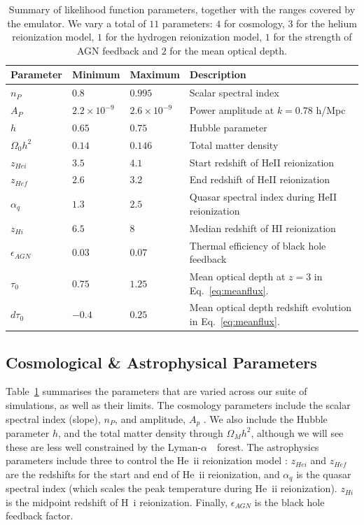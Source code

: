 \documentclass[a4paper,11pt]{article}
\newcommand{\Lya}{Lyman-$\alpha$\ }
\begin{document}
\begin{table}
\begin{centering}
  \begin{tabular}{llll}
  \hline
  Parameter & Minimum & Maximum & Description \\
    \hline
    $n_P$  &  $0.8$  & $0.995$ & Scalar spectral index \\
    $A_P$  &  $2.2 \times 10^{-9}$  & $2.6 \times 10^{-9}$ & Power amplitude at $k = 0.78$ h/Mpc \\
    $h$    & $0.65$  & $0.75$ & Hubble parameter \\
    $\Omega_0 h^2$ & $0.14$ & $0.146$ & Total matter density \\
    $z_{Hei}$      & $3.5$  & $4.1$  & Start redshift of HeII reionization \\
    $z_{Hef}$      & $2.6$  & $3.2$  & End redshift of HeII reionization \\
    $\alpha_q$     & $1.3$  & $2.5$ & Quasar spectral index during HeII reionization  \\
    $z_{Hi}$        & $6.5$ & $8$   & Median redshift of HI reionization \\
    $\epsilon_{AGN}$ & $0.03$ & $0.07$ & Thermal efficiency of black hole feedback \\
    $\tau_0$ & $0.75$ & $1.25$ & Mean optical depth at $z=3$ in Eq.~\ref{eq:meanflux}.\\
    $d \tau_0$ & $-0.4$ & $0.25$ & Mean optical depth redshift evolution in Eq.~\ref{eq:meanflux}. \\
    \hline
  \end{tabular}
  \caption{Summary of likelihood function parameters, together with the ranges covered by the emulator. We vary a total of $11$ parameters: $4$ for cosmology, $3$ for the helium reionization model, $1$ for the hydrogen reionization model, $1$ for the strength of AGN feedback and $2$ for the mean optical depth.}
  \label{tab:emulatorparams}
  \end{centering}
\end{table}

\subsection{Cosmological \& Astrophysical Parameters}\label{sec:parameters}

Table~\ref{tab:emulatorparams} summarises the parameters that are varied across our suite of simulations, as well as their limits.
The cosmology parameters include the scalar spectral index (slope), $n_P$, and amplitude, $A_p$ \cite{2019JCAP...02..050B}.
We also include the Hubble parameter $h$, and the total matter density through $\Omega_M h^2$, although we will see these are less well constrained by the \Lya~forest. The astrophysics parameters include three to control the He~{\sc ii} reionization model \cite{2020MNRAS.496.4372U}: $z_{Hei}$ and $z_{Hef}$ are the redshifts for the start and end of He~{\sc ii} reionization, and $\alpha_q$ is the quasar spectral index (which scales the peak temperature during He~{\sc ii} reionization).
$z_{Hi}$ is the midpoint redshift of H~{\sc i} reionization.
Finally, $\epsilon_{AGN}$ is the black hole feedback factor.
\end{document}
